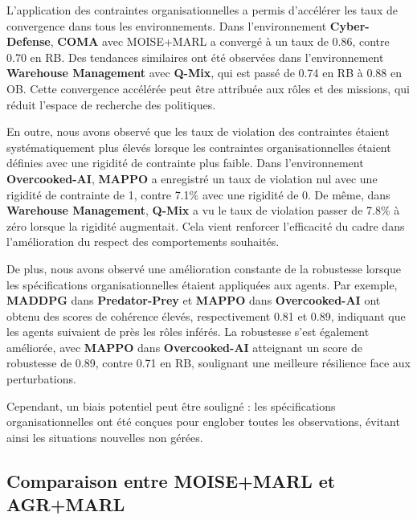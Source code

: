 \documentclass[dissemination]{jfsma}
\begin{document}
L'application des contraintes organisationnelles a permis d'accélérer les taux de convergence dans tous les environnements. Dans l'environnement \textbf{Cyber-Defense}, \textbf{COMA} avec MOISE+MARL a convergé à un taux de 0.86, contre 0.70 en RB. Des tendances similaires ont été observées dans l'environnement \textbf{Warehouse Management} avec \textbf{Q-Mix}, qui est passé de 0.74 en RB à 0.88 en OB. Cette convergence accélérée peut être attribuée aux rôles et des missions, qui réduit l'espace de recherche des politiques.

En outre, nous avons observé que les taux de violation des contraintes étaient systématiquement plus élevés lorsque les contraintes organisationnelles étaient définies avec une rigidité de contrainte plus faible. Dans l'environnement \textbf{Overcooked-AI}, \textbf{MAPPO} a enregistré un taux de violation nul avec une rigidité de contrainte de 1, contre 7.1\% avec une rigidité de 0. De même, dans \textbf{Warehouse Management}, \textbf{Q-Mix} a vu le taux de violation passer de 7.8\% à zéro lorsque la rigidité augmentait. Cela vient renforcer l'efficacité du cadre dans l'amélioration du respect des comportements souhaités.

De plus, nous avons observé une amélioration constante de la robustesse lorsque les spécifications organisationnelles étaient appliquées aux agents. Par exemple, \textbf{MADDPG} dans \textbf{Predator-Prey} et \textbf{MAPPO} dans \textbf{Overcooked-AI} ont obtenu des scores de cohérence élevés, respectivement 0.81 et 0.89, indiquant que les agents suivaient de près les rôles inférés. La robustesse s'est également améliorée, avec \textbf{MAPPO} dans \textbf{Overcooked-AI} atteignant un score de robustesse de 0.89, contre 0.71 en RB, soulignant une meilleure résilience face aux perturbations.

Cependant, un biais potentiel peut être souligné : les spécifications organisationnelles ont été conçues pour englober toutes les observations, évitant ainsi les situations nouvelles non gérées.

\subsection{Comparaison entre MOISE+MARL et AGR+MARL}
\end{document}
